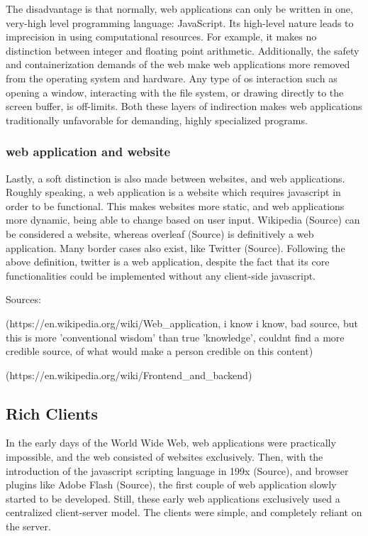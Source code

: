 The disadvantage is that normally, web applications can only be written in one, very-high level programming language: JavaScript. 
Its high-level nature leads to imprecision in using computational resources. 
For example, it makes no distinction between integer and floating point arithmetic.  
Additionally, the safety and containerization demands of the web make web applications more removed from the operating system and hardware.
Any type of \ac{os} interaction such as opening a window, interacting with the file system, or drawing directly to the screen buffer, is off-limits.  
Both these layers of indirection makes web applications traditionally unfavorable for demanding, highly specialized programs. 

\subsubsection*{web application and website}

Lastly, a soft distinction is also made between websites, and web applications. 
Roughly speaking, a web application is a website which requires javascript in order to be functional.
This makes websites more static, and web applications more dynamic, being able to change based on user input.  
Wikipedia (Source) can be considered a website, whereas overleaf (Source) is definitively a web application. 
Many border cases also exist, like Twitter (Source).
Following the above definition, twitter is a web application, despite the fact that its core functionalities could be implemented without any client-side javascript.

\begin{note}
  Sources: 

  (https://en.wikipedia.org/wiki/Web_application, i know i know, bad source, but this is more 'conventional wisdom' than true 'knowledge', couldnt find a more credible source, of what would make a person credible on this content)
  
  (https://en.wikipedia.org/wiki/Frontend_and_backend)
\end{note}


\subsection{Rich Clients}
\label{sec:background-web-rich}

In the early days of the World Wide Web, web applications were practically impossible, and the web consisted of websites exclusively. 
Then, with the introduction of the javascript scripting language in 199x (Source), and browser plugins like Adobe Flash (Source), the first couple of web application slowly started to be developed. 
Still, these early web applications exclusively used a centralized client-server model.
The clients were simple, and completely reliant on the server. 

